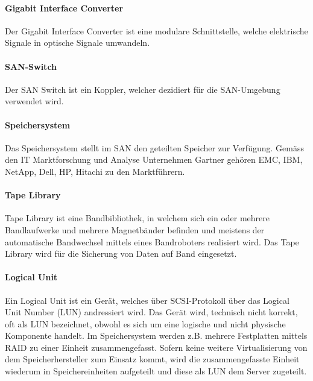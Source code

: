 \paragraph*{Gigabit Interface Converter}
Der Gigabit Interface Converter ist eine modulare Schnittstelle, welche elektrische Signale in optische Signale umwandeln.\cite{SNIA2011}

\paragraph*{SAN-Switch}
Der SAN Switch ist ein Koppler, welcher dezidiert für die SAN-Umgebung verwendet wird.

\paragraph*{Speichersystem}
Das Speichersystem stellt im SAN den geteilten Speicher zur Verfügung. Gemäss den \gls{IT} Marktforschung und Analyse Unternehmen Gartner gehören \gls{EMC}, \gls{IBM}, \gls{NetApp}, \gls{Dell}, \gls{HP}, \gls{Hitachi} zu den Marktführern\cite{RogerW.CoxPushanRinnenStanleyZaffos2011}.

\paragraph*{Tape Library}
Tape Library ist eine Bandbibliothek, in welchem sich ein oder mehrere Bandlaufwerke und mehrere Magnetbänder befinden und meistens der automatische Bandwechsel mittels eines Bandroboters realisiert wird. Das Tape Library wird für die Sicherung von Daten auf Band eingesetzt.

\paragraph*{Logical Unit}
Ein Logical Unit ist ein Gerät, welches über SCSI-Protokoll über das Logical Unit Number (LUN) andressiert wird. Das Gerät wird, technisch nicht korrekt, oft als LUN bezeichnet, obwohl es sich um eine logische und nicht physische Komponente handelt. Im Speichersystem werden z.B. mehrere Festplatten mittels RAID zu einer Einheit zusammengefasst. Sofern keine weitere Virtualisierung von dem Speicherhersteller zum Einsatz kommt, wird die zusammengefasste Einheit wiederum in Speichereinheiten aufgeteilt und diese als LUN dem Server zugeteilt.\cite{SNIA2011}

